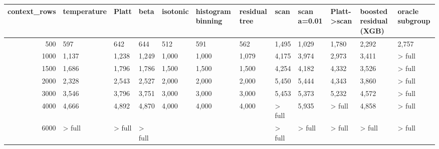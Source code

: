 \begin{tabular}{rlllllllllll}
\toprule
context_rows & temperature & Platt & beta & isotonic & histogram binning & residual tree & scan & scan a=0.01 & Platt->scan & boosted residual (XGB) & oracle subgroup \\
\midrule
500 & 597 & 642 & 644 & 512 & 591 & 562 & 1,495 & 1,029 & 1,780 & 2,292 & 2,757 \\
1000 & 1,137 & 1,238 & 1,249 & 1,000 & 1,000 & 1,079 & 4,175 & 3,974 & 2,973 & 3,411 & > full \\
1500 & 1,686 & 1,796 & 1,786 & 1,500 & 1,500 & 1,500 & 4,254 & 4,182 & 4,332 & 3,526 & > full \\
2000 & 2,328 & 2,543 & 2,527 & 2,000 & 2,000 & 2,000 & 5,450 & 5,444 & 4,343 & 3,860 & > full \\
3000 & 3,546 & 3,796 & 3,751 & 3,000 & 3,000 & 3,000 & 5,453 & 5,373 & 5,232 & 4,572 & > full \\
4000 & 4,666 & 4,892 & 4,870 & 4,000 & 4,000 & 4,000 & > full & 5,935 & > full & 4,858 & > full \\
6000 & > full & > full & > full &  &  &  & > full & > full & > full & > full & > full \\
\bottomrule
\end{tabular}
